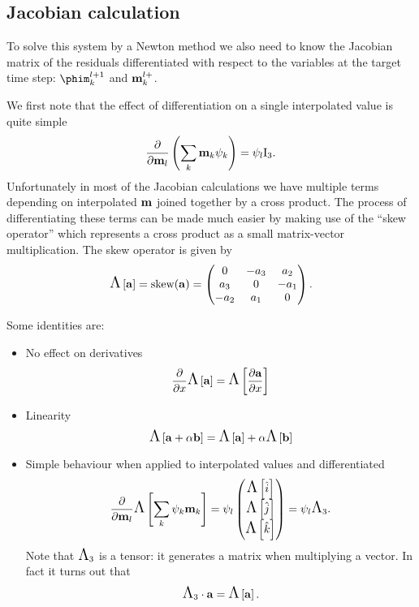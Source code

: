 \subsection{Jacobian calculation}
\label{sec:jacobian-calculation}

To solve this system by a Newton method we also need to know the Jacobian matrix of the residuals differentiated with respect to the variables at the target time step: $\phim_\ik^{\tl+1}$ and $\mathbf{m}_{k}^{l+}$.

We first note that the effect of differentiation on a single interpolated value is quite simple
\begin{equation}
  \frac{\partial }{\partial \mathbf{m}_l} \left( \sum_k \mathbf{m}_k {\psi_k} \right) = \psi_l \text{I}_3.
\end{equation}
Unfortunately in most of the Jacobian calculations we have multiple terms depending on interpolated $\mathbf{m}$ joined together by a cross product.
The process of differentiating these terms can be made much easier by making use of the ``skew operator'' which represents a cross product as a small matrix-vector multiplication.
The skew operator is given by
\begin{equation}
  \text{\Large{$\Lambda$}}\left[ {\mathbf{a}} \right] = \text{skew}({\mathbf{a}}) =
  \begin{pmatrix}
    0 & -a_3 & a_2 \\
    a_3 & 0 & -a_1 \\
    -a_2 & a_1 & 0
  \end{pmatrix}.
  \label{eqn:skew}
\end{equation}

Some identities are:
\begin{itemize}
\item No effect on derivatives
  \begin{equation}
    \frac{\partial }{\partial x} \text{\Large{$\Lambda$}}\left[ {\mathbf{a}} \right] = \text{\Large{$\Lambda$}}\left[  \frac{\partial {\mathbf{a}}}{\partial x}  \right]
  \end{equation}

\item Linearity
  \begin{equation}
    \text{\Large{$\Lambda$}}\left[ {\mathbf{a}} + \alpha {\mathbf{b}} \right] = \text{\Large{$\Lambda$}}\left[ {\mathbf{a}} \right] + \alpha \text{\Large{$\Lambda$}}\left[ {\mathbf{b}} \right]
  \end{equation}

\item Simple behaviour when applied to interpolated values and differentiated
  \begin{equation}
    \frac{\partial }{\partial \mathbf{m}_l} \text{\Large{$\Lambda$}}\left[ \sum_{k} {\psi_k} \mathbf{m}_{k} \right] = \psi_l \begin{pmatrix} \text{\Large{$\Lambda$}}\left[ {\hat{i}} \right] \\ \text{\Large{$\Lambda$}}\left[ {\hat{j}} \right] \\ \text{\Large{$\Lambda$}}\left[ {\hat{k}} \right] \end{pmatrix}
    = \psi_l \text{\Large{$\Lambda$}}_3.
  \end{equation}
  Note that $\text{\Large{$\Lambda$}}_3$ is a tensor: it generates a matrix when multiplying a vector. In fact it turns out that
  \begin{equation}
    \text{\Large{$\Lambda$}}_3 \cdot {\mathbf{a}} = \text{\Large{$\Lambda$}}\left[ {\mathbf{a}} \right].
  \end{equation}

\end{itemize}

